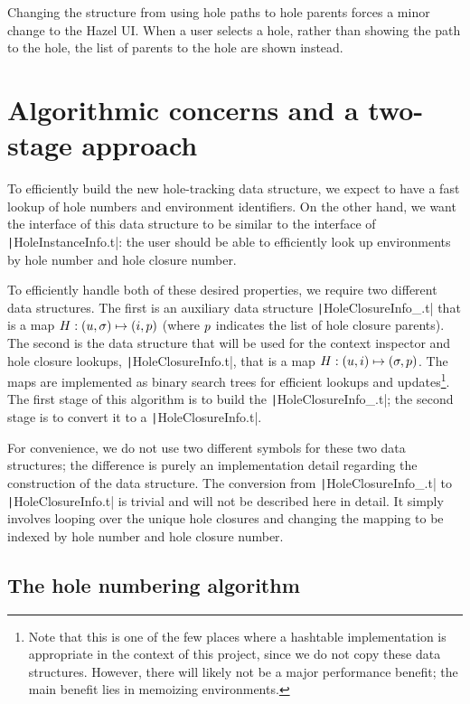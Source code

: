 Changing the structure from using hole paths to hole parents forces a minor change to the Hazel UI. When a user selects a hole, rather than showing the path to the hole, the list of parents to the hole are shown instead.

\section{Algorithmic concerns and a two-stage approach}
\label{sec:two-stage-renumber}

To efficiently build the new hole-tracking data structure, we expect to have a fast lookup of hole numbers and environment identifiers. On the other hand, we want the interface of this data structure to be similar to the interface of \texttt|HoleInstanceInfo.t|: the user should be able to efficiently look up environments by hole number and hole closure number.

To efficiently handle both of these desired properties, we require two different data structures. The first is an auxiliary data structure \texttt|HoleClosureInfo_.t| that is a map $H:(u,\sigma)\mapsto(i,p)$ (where $p$ indicates the list of hole closure parents). The second is the data structure that will be used for the context inspector and hole closure lookups, \texttt|HoleClosureInfo.t|, that is a map $H:(u,i)\mapsto(\sigma,p)$. The maps are implemented as binary search trees for efficient lookups and updates\footnote{Note that this is one of the few places where a hashtable implementation is appropriate in the context of this project, since we do not copy these data structures. However, there will likely not be a major performance benefit; the main benefit lies in memoizing environments.}. The first stage of this algorithm is to build the \texttt|HoleClosureInfo_.t|; the second stage is to convert it to a \texttt|HoleClosureInfo.t|.

For convenience, we do not use two different symbols for these two data structures; the difference is purely an implementation detail regarding the construction of the data structure. The conversion from \texttt|HoleClosureInfo_.t| to \texttt|HoleClosureInfo.t| is trivial and will not be described here in detail. It simply involves looping over the unique hole closures and changing the mapping to be indexed by hole number and hole closure number.

\subsection{The hole numbering algorithm}
\label{sec:hole-numbering-algorithm}

